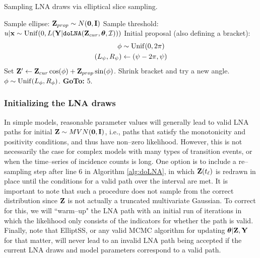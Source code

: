 \begin{algorithm}[!ht]
	\caption{Sampling LNA draws via elliptical slice sampling.}
	\label{alg:elliptss_lna}
	\begin{algorithmic}[1]
		\State Sample ellipse: $ \mathbf{Z}_{prop} \sim N(\boldsymbol{0}, \mathbf{I}) $
		\State Sample threshold: $ u|\mathbf{x} \sim \mathrm{Unif}(0, L(\mathbf{Y}|\texttt{doLNA}(\mathbf{Z}_{cur},\boldsymbol{\theta},\mathcal{I}))) $
		\State Initial proposal (also defining a bracket): \vspace{-0.1in}
		\begin{align*}
		\phi &\sim \mathrm{Unif}(0,2\pi)\\
		(L_{\psi}, R_\psi) &\leftarrow (\psi - 2\pi, \psi)
		\end{align*}
		\State Set $ \mathbf{Z}' \leftarrow \mathbf{Z}_{cur}\cos(\phi) + \mathbf{Z}_{prop}\sin(\phi) $. 
		\State{}
		\Else
		\State Shrink bracket and try a new angle.
		\State $ \phi \sim \mathrm{Unif}(L_\phi, R_\phi) $.
		\State \textbf{GoTo:} 5.
		\EndIf
		\EndProcedure
	\end{algorithmic}
\end{algorithm}

\subsubsection{Initializing the LNA draws}
\label{subsubsec:lna_init}
In simple models, reasonable parameter values will generally lead to valid LNA paths for initial $ \mathbf{Z}\sim MVN(\boldsymbol{0},\mathbf{I}) $, i.e., paths that satisfy the monotonicity and positivity conditions, and thus have non--zero likelihood. However, this is not necessarily the case for complex models with many types of transition events, or when the time--series of incidence counts is long. One option is to include a re--sampling step after line 6 in Algorithm \ref{alg:doLNA}, in which $ \mathbf{Z}(t_\ell) $ is redrawn in place until the conditions for a valid path over the interval are met. It is important to note that such a procedure does not sample from the correct distribution since $ \mathbf{Z} $ is not actually a truncated multivariate Gaussian. To correct for this, we will ``warm--up" the LNA path with an initial run of \doElliptSS iterations in which the likelihood only consists of the indicators for whether the path is valid. Finally, note that ElliptSS, or any valid MCMC algorithm for updating $ \boldsymbol{\theta}|\mathbf{Z},\mathbf{Y} $ for that matter, will never lead to an invalid LNA path being accepted if the current LNA draws and model parameters correspond to a valid path.

